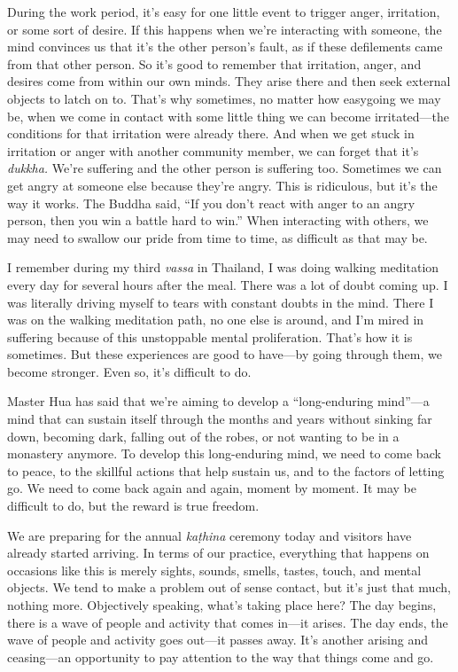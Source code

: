 During the work period, it's easy for one little event to trigger 
anger, irritation, or some sort of desire. If this happens when we're 
interacting with someone, the mind convinces us that it's the other 
person's fault, as if these defilements came from that other person. So 
it's good to remember that irritation, anger, and desires come from 
within our own minds. They arise there and then seek external objects 
to latch on to. That's why sometimes, no matter how easygoing we may 
be, when we come in contact with some little thing we can become 
irritated---the conditions for that irritation were already there. And 
when we get stuck in irritation or anger with another community member, 
we can forget that it's \emph{dukkha.} We're suffering and the other 
person is suffering too. Sometimes we can get angry at someone else 
because they're angry. This is ridiculous, but it's the way it works. 
The Buddha said, ``If you don't react with anger to an angry person, 
then you win a battle hard to win.'' When interacting with others, we 
may need to swallow our pride from time to time, as difficult as that 
may be.

I remember during my third \emph{vassa} in Thailand, I was doing 
walking meditation every day for several hours after the meal. There 
was a lot of doubt coming up. I was literally driving myself to tears 
with constant doubts in the mind. There I was on the walking meditation 
path, no one else is around, and I'm mired in suffering because of this 
unstoppable mental proliferation. That's how it is sometimes. But these 
experiences are good to have---by going through them, we become 
stronger. Even so, it's difficult to do.

Master Hua has said that we're aiming to develop a ``long-enduring 
mind''---a mind that can sustain itself through the months and years 
without sinking far down, becoming dark, falling out of the robes, or 
not wanting to be in a monastery anymore. To develop this long-enduring 
mind, we need to come back to peace, to the skillful actions that help 
sustain us, and to the factors of letting go. We need to come back 
again and again, moment by moment. It may be difficult to do, but the 
reward is true freedom.


We are preparing for the annual \emph{kaṭhina} ceremony today and 
visitors have already started arriving. In terms of our practice, 
everything that happens on occasions like this is merely sights, 
sounds, smells, tastes, touch, and mental objects. We tend to make a 
problem out of sense contact, but it's just that much, nothing more. 
Objectively speaking, what's taking place here? The day begins, there 
is a wave of people and activity that comes in---it arises. The day 
ends, the wave of people and activity goes out---it passes away. It's 
another arising and ceasing---an opportunity to pay attention to the 
way that things come and go.

